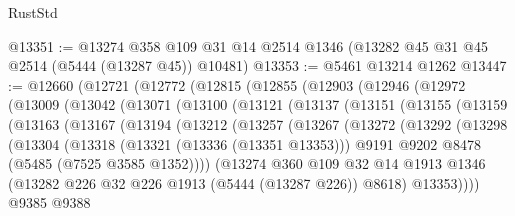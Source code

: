 \begin{lexlean}{RustStd}
\begin{coremodule}
@13351 := @13274
    @358
    @109
    @31
    @14
    @2514
    @1346
    (@13282 @45 @31 @45 @2514 (@5444 (@13287 @45)) @10481)
@13353 := @5461 @13214 @1262
@13447 := @12660
    (@12721
      (@12772
        (@12815
          (@12855
            (@12903
              (@12946
                (@12972
                  (@13009
                    (@13042
                      (@13071
                        (@13100
                          (@13121
                            (@13137
                              (@13151
                                (@13155
                                  (@13159
                                    (@13163
                                      (@13167
                                        (@13194
                                          (@13212
                                            (@13257
                                              (@13267
                                                (@13272
                                                  (@13292
                                                    (@13298
                                                      (@13304
                                                        (@13318
                                                          (@13321 (@13336 (@13351 @13353)))
                                                          @9191
                                                          @9202
                                                          @8478
                                                          (@5485 (@7525 @3585 @1352))))
                                                      (@13274
                                                        @360
                                                        @109
                                                        @32
                                                        @14
                                                        @1913
                                                        @1346
                                                        (@13282
                                                          @226
                                                          @32
                                                          @226
                                                          @1913
                                                          (@5444 (@13287 @226))
                                                          @8618)
                                                        @13353))))
                                                @9385
                                                @9388

\end{coremodule}
\end{lexlean}

